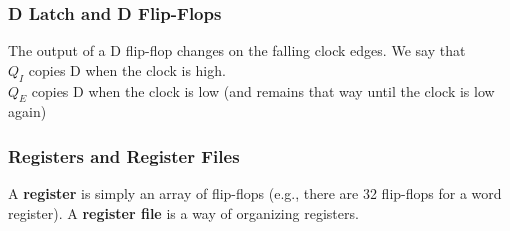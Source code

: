 \documentclass{report}
\begin{document}
\subsubsection{D Latch and D Flip-Flops}
The output of a D flip-flop changes on the falling clock edges. We say that\\
$Q_I$ copies D when the clock is high.\\
$Q_E$ copies D when the clock is low (and remains that way until the clock is low again)
\subsubsection{Registers and Register Files}
A \textbf{register} is simply an array of flip-flops (e.g., there are 32 flip-flops for a word register). A \textbf{register file} is a way of organizing registers.
\end{document}
